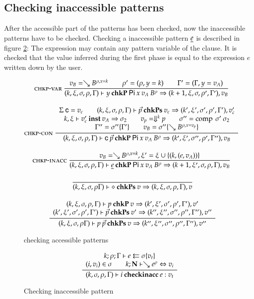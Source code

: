 \subsection{Checking inaccessible patterns}

After the accessible part of the patterns has been checked, now the inaccessible patterns have to be checked.
Checking a inaccessible pattern $\underline{e}$ is described in figure \ref{fphase2}: 
The expression may contain any pattern variable of the clause. 
It is checked that the value inferred during the first phase is equal to the expression $e$ written down by the user.

\begin{figure}[htp]
\begin{gather*}
\mbox{\sc chkp-var}\ \dfrac{v_B = \searrow B^{\rho,x=k} \qquad \rho' =(\rho,y=k) \qquad \Gamma' = (\Gamma,y=v_A)}{
(k,\xi,\sigma,\rho,\Gamma)\vdash y\:\mathbf{chkP}\:\mathsf{Pi} \: x \: v_A \: B^{\rho}\Rightarrow (k+1,\xi,\sigma,\rho',\Gamma'),v_B}
\\[2ex]
\mbox{\sc chkp-con}\ \dfrac{\begin{array}[b]{c}\Sigma \: {\mathsf{c}}=v_c \qquad
(k,\xi,\sigma,\rho,\Gamma)\vdash\vec{p}\:\mathbf{chkPs}\:v_c\Rightarrow (k',\xi',\sigma',\rho',\Gamma'),v'_c
\\k,\xi\vdash v'_c\:\mathbf{inst}\:v_A\Rightarrow \sigma_2
\qquad
v_p = \Downarrow^{k}p    
\qquad
\sigma'' = \operatorname{comp}\:\sigma'\:\sigma_2
\\
\Gamma'' = \sigma''\{\Gamma'\} \qquad
v_B = \sigma''\{\searrow B^{\rho,x=v_p}\}
\end{array}}{(k,\xi,\sigma,\rho,\Gamma)\vdash\mathsf{c} \: \vec{p}\:\mathbf{chkP}\:\mathsf{Pi} \: x \: v_A \: B^{\rho}\Rightarrow (k',\xi',\sigma'',\rho',\Gamma''),v_B
}
\\[2ex]
\mbox{\sc chkp-inacc}\ \dfrac{v_B = \searrow B^{\rho,x=k} , \xi' = \xi \cup \{ (k,(e,v_A)) \} }{
(k,\xi,\sigma,\rho,\Gamma)\vdash\underline{e}\:\mathbf{chkP}\:\mathsf{Pi} \: x \: v_A \: B^{\rho}\Rightarrow (k+1,\xi',\sigma,\rho,\Gamma),v_B}
\\[2ex]
\ \dfrac{}{
(k,\xi,\sigma,\rho\Gamma)\vdash\diamond\:\mathbf{chkPs}\:v\Rightarrow (k,\xi,\sigma,\rho,\Gamma),v}
\\[2ex]
\ \dfrac{\begin{array}[b]{c}(k,\xi,\sigma,\rho,\Gamma)\vdash p\:\mathbf{chkP}\:v\Rightarrow (k',\xi',\sigma',\rho',\Gamma'),v'
\\(k',\xi',\sigma',\rho',\Gamma')\vdash\vec{p}\:\mathbf{chkPs}\:v'\Rightarrow (k'',\xi'',\sigma'',\rho'',\Gamma''),v''
\end{array}}{
(k,\xi,\sigma,\rho\Gamma)\vdash p \: \vec{p}\:\mathbf{chkPs}\:v\Rightarrow (k'',\xi'',\sigma'',\rho'',\Gamma''),v''}
\end{gather*}
\caption{checking accessible patterns}
\label{fphase1}
\end{figure}

\begin{figure}[htp]
\begin{gather*}
\ \dfrac{\begin{array}[b]{c}
k;\rho;\Gamma\vdash e\leftleftarrows\sigma\{v_t\}
\\
(i,v_i) \in \sigma \qquad k;\mathbf{N}\vdash\searrow e^{\rho}\Leftrightarrow v_i
\end{array}}{
(k,\sigma,\rho,\Gamma)\vdash i\:\mathbf{checkinacc}\:e : v_t
}
\end{gather*}
\caption{Checking inaccessible pattern}
\label{fphase2}
\end{figure}

